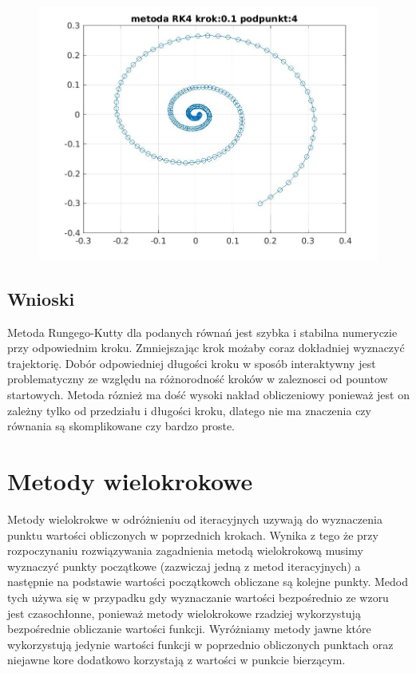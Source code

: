 \documentclass[a4paper, 11pt]{article}
\begin{document}
\begin{figure}[H]
\centering
\includegraphics[width = 15cm]{2d/metoda RK4 krok:0,1 podpunkt:4.jpg}
\end{figure}

\subsection{Wnioski}
Metoda Rungego-Kutty dla podanych równań jest szybka i stabilna numeryczie przy odpowiednim kroku. Zmniejszając krok możaby coraz dokładniej wyznaczyć trajektorię. Dobór odpowiedniej długości kroku w sposób interaktywny jest problematyczny ze względu na różnorodność kroków w zaleznosci od pountow startowych. Metoda róznież ma dość wysoki nakład obliczeniowy ponieważ jest on zależny tylko od przedziału i długości kroku, dlatego nie ma znaczenia czy równania są skomplikowane czy bardzo proste. 

\section{Metody wielokrokowe}
Metody wielokrokwe w odróżnieniu od iteracyjnych uzywają do wyznaczenia punktu wartości obliczonych w poprzednich krokach. Wynika z tego że przy rozpoczynaniu rozwiązywania zagadnienia metodą wielokrokową musimy wyznaczyć punkty początkowe (zazwiczaj jedną z metod iteracyjnych) a następnie na podstawie wartości początkowch obliczane są kolejne punkty. Medod tych używa się w przypadku gdy wyznaczanie wartości bezpośrednio ze wzoru jest czasochłonne, ponieważ metody wielokrokowe rzadziej wykorzystują bezpośrednie obliczanie wartości funkcji. Wyróżniamy metody jawne które wykorzystują jedynie wartości funkcji w poprzednio obliczonych punktach oraz niejawne kore dodatkowo korzystają z wartości w punkcie bierzącym. 
\end{document}
